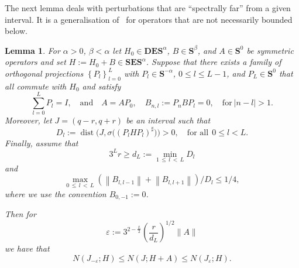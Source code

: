 \documentclass[10pt]{amsart}
\newtheorem{lemm}[theo]{Lemma}\newtheorem{prop}[theo]{Proposition}\newtheorem{coro}[theo]{Corollary}\newtheorem{conj}[theo]{Conjecture}
\theoremstyle{definition}\newtheorem{defi}[theo]{Definition}\newtheorem{rema}[theo]{Remark}\newtheorem{exam}[theo]{Example}\newtheorem{nota}[theo]{Notation}
\newcommand{\BD}{\mathbf D}
\newcommand{\BE}{\mathbf E}
\newcommand{\BS}{\mathbf S}
\newcommand{\eps}{\varepsilon}
\newcommand{\abs}[1]{\left\lvert #1 \right\rvert}
\newcommand{\set}[1]{\left\{ #1 \right\}}
\newcommand{\norm}[1]{\left\| #1 \right\|}
\begin{document}
The next lemma deals with perturbations that are ``spectrally far'' from a given interval. It is a generalisation of~\cite[Lemma~11.1]{MorParSht2014} for operators that are not necessarily bounded below.


\begin{lemm} \label{lem:spectralperturb}
For $\alpha>0$, $\beta < \alpha$ let $H_0 \in \BD\BE\BS^\alpha$, $B \in \BS^\beta$, and $A\in\BS^0$ be symmetric operators and set $H:=H_0+B\in\BS\BE\BS^\alpha$. Suppose that there exists a family of orthogonal projections $\set{P_l}_{l=0}^L$ with $P_l\in \BS^{-\alpha}$, $0\leq l\leq L-1$, and $P_L\in \BS^0$ that all commute with $H_0$ and satisfy
\begin{equation}\label{eq:projections}
\sum_{l=0}^L P_l = I, \quad \text{and} \quad A = A P_0, \quad B_{n,l} := P_n B P_l = 0, \quad \text{for} \ \abs{n-l}>1.
\end{equation}
Moreover, let $J = (q-r,q+r)$ be an interval such that
\begin{equation}\label{eq:distspectrum}
D_l:=\operatorname{dist}\big(J,\sigma\big((P_l H P_l)^\sharp\big)\big)>0,\quad \text{for all}\ \ 0\leq l<L.
\end{equation}
Finally, assume that
\begin{equation}\label{eq:tecassL}
3^Lr\geq d_L:=\min\limits_{1\,\leq\,l\,<\,L} D_l
\end{equation}
and
\begin{equation}\label{eq:projectionnorm}
\max_{0\,\le\,l\,<\,L} (\norm{B_{l,l-1}} + \norm{B_{l,l+1}})/D_l \le 1/4,
\end{equation}
where we use the convention $B_{0,-1}:=0$.

Then for
\begin{equation}\label{eq:epschoice}
\eps := 3^{2 - \frac{L}{2}} \left(\frac{r}{d_L}\right)^{1/2} \|A\|
\end{equation}
we have that
\begin{equation}
N(J_{-\eps};H) \le N(J;H + A) \le N\left(J_{\eps};H\right).\label{eq:approximationcontrol}
\end{equation}
\end{lemm}
\end{document}
